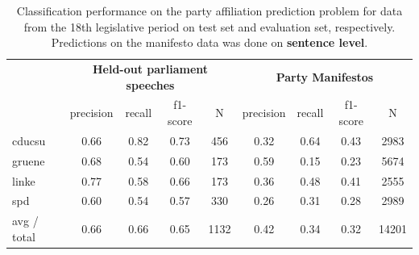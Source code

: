 \documentclass[runningheads,a4paper]{llncs}
\begin{document}
\begin{table}[t]
\caption{
\label{tab:results_18}
Classification performance on the party affiliation prediction problem for data from the 18th legislative period on test set and evaluation set, respectively.  Predictions on the manifesto data was done on {\bf sentence level}.
}
\begin{center}
\begin{tabular}{lcccccccc}
& \multicolumn{4}{c}{\bf Held-out parliament speeches} & \multicolumn{4}{c}{\bf Party Manifestos}\\
    &         precision    &recall &  f1-score  & N    &         precision    &recall &  f1-score  & N\\
\hline \hline
    cducsu    &   0.66   &   0.82   &   0.73    &   456 & 0.32  &    0.64  &    0.43    &  2983\\
     gruene   &    0.68    &  0.54   &   0.60    &   173   &0.59   &   0.15   &   0.23   &   5674\\
      linke     &  0.77  &    0.58    &  0.66    &   173 & 0.36   &   0.48   &   0.41   &   2555\\
        spd     &  0.60  &    0.54   &   0.57    &   330 & 0.26 &     0.31   &   0.28     & 2989\\
\hline
avg / total    &   0.66  &    0.66  &    0.65   &   1132&  0.42 &     0.34  &    0.32&     14201\\
%
\end{tabular}
\end{center}

\end{table}
\end{document}
